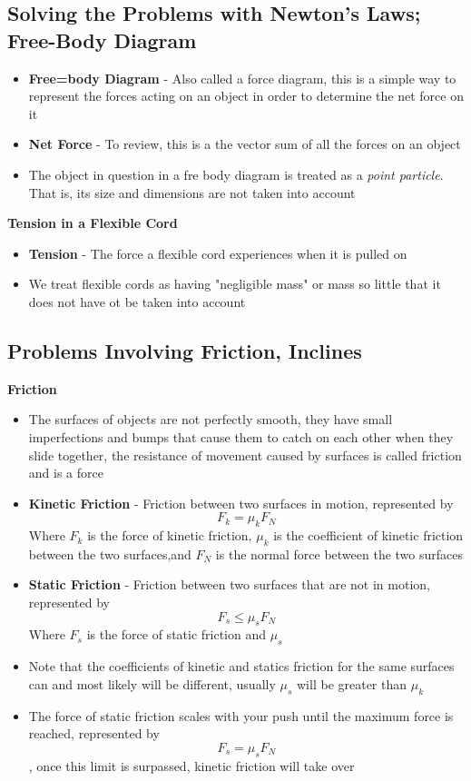 \subsection{Solving the Problems with Newton's Laws; Free-Body Diagram}
\begin{itemize}
    \item \textbf{Free=body Diagram} - Also called a force diagram, this is a simple way to represent the forces acting on an object in order to determine the net force on it
    \item \textbf{Net Force} -  To review, this is a the vector sum of all the forces on an object
    \item The object in question in a fre body diagram is treated as a \emph{point particle}. That is, its size and dimensions are not taken into account
\end{itemize}
\textbf{Tension in a Flexible Cord}
\begin{itemize}
    \item \textbf{Tension} - The force a flexible cord experiences when it is pulled on
    \item We treat flexible cords as having "negligible mass" or mass so little that it does not have ot be taken into account
\end{itemize}

\subsection{Problems Involving Friction, Inclines}
\textbf{Friction}
\begin{itemize}
    \item The surfaces of objects are not perfectly smooth, they have small imperfections and bumps that cause them to catch on each other when they slide together, the resistance of movement caused by surfaces is called friction and is a force
    \item \textbf{Kinetic Friction} - Friction between two surfaces in motion, represented by \[F_k=\mu_k F_N\] Where $F_k$ is the force of kinetic friction, $\mu_k$ is the coefficient of kinetic friction between the two surfaces,and $F_N$ is the normal force between the two surfaces
    \item \textbf{Static Friction} - Friction between two surfaces that are not in motion, represented by \[F_s\leq\mu_s F_N\] Where $F_s$ is the force of static friction and $\mu_s$ 
    \item Note that the coefficients of kinetic and statics friction for the same surfaces can and most likely will be different, usually $\mu_s$ will be greater than $\mu_k$
    \item The force of static friction scales with your push until the maximum force is reached, represented by \[F_s=\mu_s F_N\], once this limit is surpassed, kinetic friction will take over
\end{itemize}

